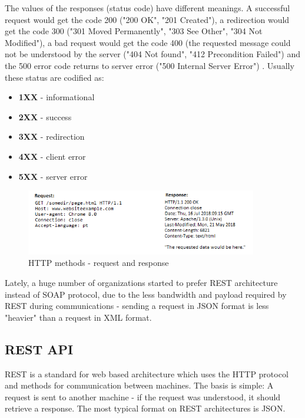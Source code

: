\documentclass[mim_thesis.tex]{subfiles}
\begin{document}
The values of the responses (status code) have different meanings. A successful request would get the code 200 ("200 OK", "201 Created"), a redirection would get the code 300 ("301 Moved Permanently", "303 See Other", "304 Not Modified"), a bad request would get the code 400 (the requested message could not be understood by the server ("404 Not found", "412 Precondition Failed") and the 500 error code returns to server error ("500 Internal Server Error") \citep{sundvall2013applying}. Usually these status are codified as:

\begin{itemize}[noitemsep]
\item \textbf{1XX} - informational
\item \textbf{2XX} - success
\item \textbf{3XX} - redirection
\item \textbf{4XX} - client error
\item \textbf{5XX} - server error
\end{itemize}



\begin{figure}[H]
	\centering
    \includegraphics[width=0.9\textwidth]{img/http_request_reply.PNG}
	\caption{HTTP methods - request and response}
	\label{fig:http_request_reply}
\end{figure}

Lately, a huge number of organizations started to prefer REST architecture instead of SOAP protocol, due to the less bandwidth and payload required by REST during communications - sending a request in JSON format is less "heavier" than a request in XML format.

\subsection{REST API}
REST is a standard for web based architecture which uses the HTTP protocol and methods for communication between machines. The basis is simple: A request is sent to another machine - if the request was understood, it should retrieve a response. The most typical format on REST architectures is JSON.
\end{document}
